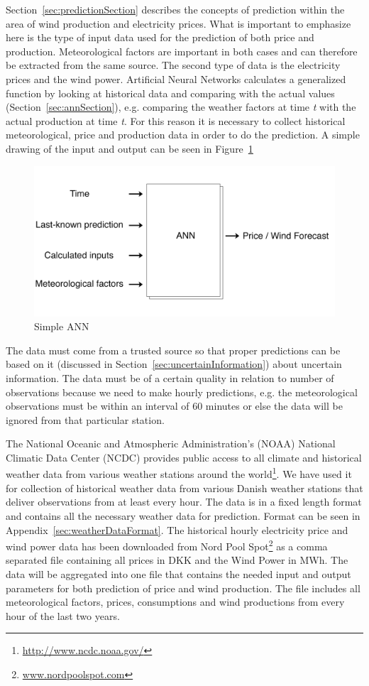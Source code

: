 Section~\ref{sec:predictionSection} describes the concepts of prediction within the area of wind production and electricity prices. What is important to emphasize here is the type of input data used for the prediction of both price and production. Meteorological factors are important in both cases and can therefore be extracted from the same source. The second type of data is the electricity prices and the wind power. Artificial Neural Networks calculates a generalized function by looking at historical data and comparing with the actual values (Section~\ref{sec:annSection}), e.g. comparing the weather factors at time \emph{t} with the actual production at time \emph{t}. For this reason it is necessary to collect historical meteorological, price and production data in order to do the prediction. A simple drawing of the input and output can be seen in Figure~\ref{fig:verySimpleANN}

\begin{figure}[ht!]
\centering
\includegraphics[width=0.85\linewidth]{billeder/simpleANN.png}
\caption{Simple ANN}
\label{fig:verySimpleANN}
\end{figure}

The data must come from a trusted source so that proper predictions can be based on it (discussed in Section~\ref{sec:uncertainInformation}) about uncertain information. The data must be of a certain quality in relation to number of observations because we need to make hourly predictions, e.g. the meteorological observations must be within an interval of 60 minutes or else the data will be ignored from that particular station.

The National Oceanic and Atmospheric Administration's (NOAA) National Climatic Data Center (NCDC) provides public access to all climate and historical weather data from various weather stations around the world\footnote{\url{http://www.ncdc.noaa.gov/}}. We have used it for collection of historical weather data from various Danish weather stations that deliver observations from at least every hour. The data is in a fixed length format and contains all the necessary weather data for prediction. Format can be seen in Appendix~\ref{sec:weatherDataFormat}. 
The historical hourly electricity price and wind power data has been downloaded from Nord Pool Spot\footnote{\url{www.nordpoolspot.com}} as a comma separated file containing all prices in DKK and the Wind Power in MWh.
The data will be aggregated into one file that contains the needed input and output parameters for both prediction of price and wind production. The file includes all meteorological factors, prices, consumptions and wind productions from every hour of the last two years. 

